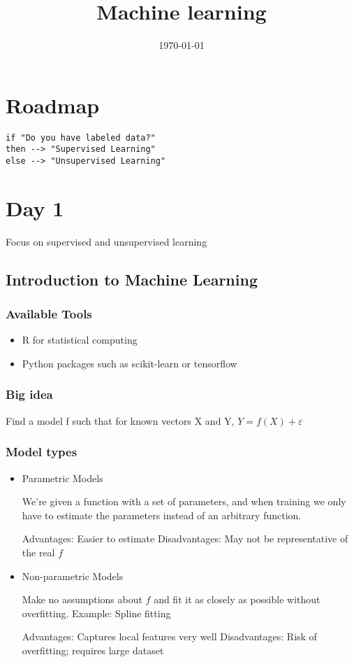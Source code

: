 \documentclass[11pt]{article}
\date{\today}
\title{Machine learning}
\begin{document}
\maketitle
\tableofcontents


\section*{Roadmap}
\label{sec-1}

\begin{verbatim}
if "Do you have labeled data?"
then --> "Supervised Learning"
else --> "Unsupervised Learning"
\end{verbatim}

\section*{Day 1}
\label{sec-2}

Focus on supervised and unsupervised learning
\subsection{Introduction to Machine Learning}
\label{sec-2-1}

\subsubsection*{Available Tools}
\label{sec-2-1-1}

\begin{itemize}
\item R for statistical computing
\item Python packages such as scikit-learn or tensorflow
\end{itemize}
\subsubsection*{Big idea}
\label{sec-2-1-2}

Find a model f such that for known vectors X and Y, $Y=f(X)+\varepsilon$
\subsubsection*{Model types}
\label{sec-2-1-3}

\begin{itemize}
\item Parametric Models
\label{sec-2-1-3-1}

We're given a function with a set of parameters, and when training we only have to estimate the parameters instead of an arbitrary function.

Advantages: Easier to estimate
Disadvantages: May not be representative of the real $f$

\item Non-parametric Models
\label{sec-2-1-3-2}

Make no assumptions about $f$ and fit it as closely as possible without overfitting. Example: Spline fitting

Advantages: Captures local features very well
Disadvantages: Risk of overfitting; requires large dataset
\end{itemize}
\end{document}

